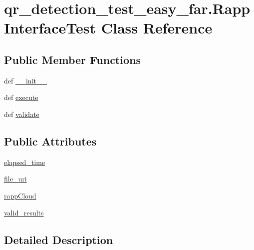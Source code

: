 \hypertarget{classqr__detection__test__easy__far_1_1RappInterfaceTest}{\section{qr\-\_\-detection\-\_\-test\-\_\-easy\-\_\-far.\-Rapp\-Interface\-Test Class Reference}
\label{classqr__detection__test__easy__far_1_1RappInterfaceTest}
}
\subsection*{Public Member Functions}
\begin{DoxyCompactItemize}
\item 
def \hyperlink{classqr__detection__test__easy__far_1_1RappInterfaceTest_a81f5743944a1db8cf7ecbd88cc01923b}{\-\_\-\-\_\-init\-\_\-\-\_\-}
\item 
def \hyperlink{classqr__detection__test__easy__far_1_1RappInterfaceTest_acf636420fcbae6b0c1b5d00f6fd2d4c1}{execute}
\item 
def \hyperlink{classqr__detection__test__easy__far_1_1RappInterfaceTest_abc93831c8e255bddfbae9c30f97c165c}{validate}
\end{DoxyCompactItemize}
\subsection*{Public Attributes}
\begin{DoxyCompactItemize}
\item 
\hyperlink{classqr__detection__test__easy__far_1_1RappInterfaceTest_ad8244cb14e4a8d6b13d50f8d2e806dc2}{elapsed\-\_\-time}
\item 
\hyperlink{classqr__detection__test__easy__far_1_1RappInterfaceTest_a472b2589c1c9e32bf851c0ce015f8f6d}{file\-\_\-uri}
\item 
\hyperlink{classqr__detection__test__easy__far_1_1RappInterfaceTest_a8d4e9cc90041c6a287e434a180c9755d}{rapp\-Cloud}
\item 
\hyperlink{classqr__detection__test__easy__far_1_1RappInterfaceTest_ac2980ccae8d608d700453daf03ef8705}{valid\-\_\-results}
\end{DoxyCompactItemize}


\subsection{Detailed Description}


